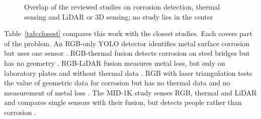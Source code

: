 \begin{figure}[htbp]
\centering
{}
\caption{Overlap of the reviewed studies on corrosion detection, thermal sensing
and LiDAR or 3D sensing; no study lies in the center}
\label{fig:gap}
\end{figure}

Table~\ref{tab:closest} compares this work with the closest studies. Each covers
part of the problem. An RGB-only YOLO detector identifies metal surface corrosion
but uses one sensor \citep{Fu2024}. RGB-thermal fusion detects corrosion on steel bridges
but has no geometry \citep{Lim2021}. RGB-LiDAR fusion measures metal loss, but only on
laboratory plates and without thermal data \citep{Maru2025}. RGB with laser triangulation
tests the value of geometric data for corrosion but has no thermal data and no
measurement of metal loss \citep{Haitz2022}. The MID-1K study senses RGB, thermal and
LiDAR and compares single sensors with their fusion, but detects people rather
than corrosion \citep{Mota2024}.

